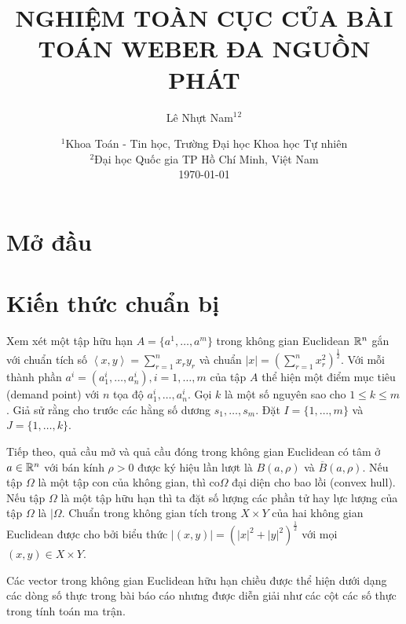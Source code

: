 \documentclass[a4paper]{report}
\title{NGHIỆM TOÀN CỤC CỦA BÀI TOÁN WEBER ĐA NGUỒN PHÁT}
\author{Lê Nhựt Nam$^1$$^2$}
\date{
    $^1$Khoa Toán - Tin học, Trường Đại học Khoa học Tự nhiên\\%
    $^2$Đại học Quốc gia TP Hồ Chí Minh, Việt Nam\\%
    \vfill
    \today
}
\begin{document}
    \maketitle
    \tableofcontents
    
    \chapter{Mở đầu}


    \chapter{Kiến thức chuẩn bị}

    Xem xét một tập hữu hạn $A = \{a^1, \dots, a^m\}$ trong không gian Euclidean $\mathbb{R}^n$ gắn với chuẩn tích số $\left< x, y\right> = \sum_{r = 1}^nx_ry_r$ và chuẩn $\left|x\right| = \left(\sum_{r=1}^nx_r^2\right)^{\frac{1}{2}}$. Với mỗi thành phần $a^i = (a_1^i, \dots, a_n^i), i = 1, \dots, m$ của tập $A$ thể hiện một điểm mục tiêu (demand point) với $n$ tọa độ $a_1^i, \dots, a_n^i$. Gọi $k$ là một số nguyên sao cho $1 \leq k \leq m$. Giả sử rằng cho trước các hằng số dương $s_1, \dots, s_m$. Đặt $I = \{1, \dots, m\}$ và $J = \{1, \dots, k\}$.

    Tiếp theo, quả cầu mở và quả cầu đóng trong không gian Euclidean có tâm ở $a \in \mathbb{R}^n$ với bán kính $\rho > 0$ được ký hiệu lần lượt là $B(a, \rho)$ và $\overline{B}(a, \rho)$. Nếu tập $\Omega$ là một tập con của không gian, thì $\text{co}\Omega$ đại diện cho bao lồi (convex hull). Nếu tập $\Omega$ là một tập hữu hạn thì ta đặt số lượng các phần tử hay lực lượng của tập $\Omega$ là $|\Omega$. Chuẩn trong không gian tích trong $X \times Y$ của hai không gian Euclidean được cho bởi biểu thức $\left| (x, y)\right| = (\left|x\right|^2 + \left|y\right|^2)^{\frac{1}{2}}$ với mọi $(x, y) \in X \times Y$. 
    
    \begin{note}
        Các vector trong không gian Euclidean hữu hạn chiều được thể hiện dưới dạng các dòng số thực trong bài báo cáo nhưng được diễn giải như các cột các số thực trong tính toán ma trận. 
    \end{note}
    
\end{document}
